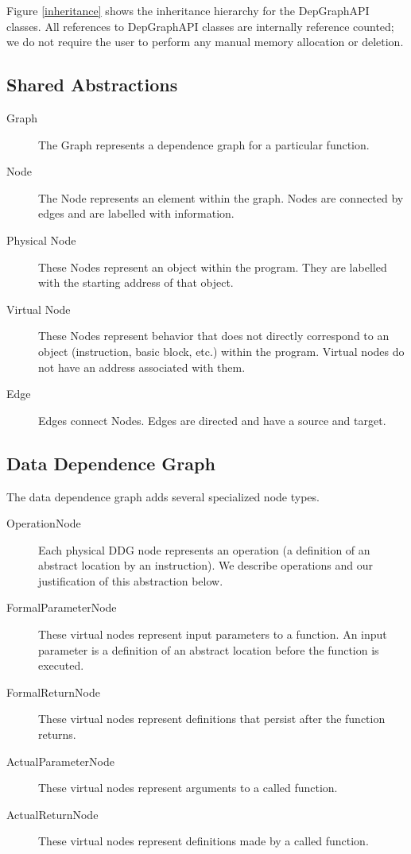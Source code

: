 \documentclass[12pt,titlepage]{article}
\begin{document}
Figure \ref{inheritance} shows the
inheritance hierarchy for the DepGraphAPI classes. All references to
DepGraphAPI classes are internally reference counted; we do not
require the user to perform any manual memory allocation or deletion.

\subsection{Shared Abstractions}

\begin{description}
\item[Graph] The Graph represents a dependence graph for a particular
function.
\item[Node] The Node represents an element within the graph. Nodes are
connected by edges and are labelled with information.
\item[Physical Node] These Nodes represent an object within the
program. They are labelled with the starting address of that object.
\item[Virtual Node] These Nodes represent behavior that does not
directly correspond to an object (instruction, basic block, etc.)
within the program. Virtual nodes do not have an address associated
with them.
\item[Edge] Edges connect Nodes. Edges are directed and have a source
and target.
\end{description}

\subsection{Data Dependence Graph}

The data dependence graph adds several specialized node types.

\begin{description}
\item[OperationNode] Each physical
DDG node represents an operation (a definition of an abstract location
by an instruction). We describe operations and our justification of
this abstraction below.  
\item[FormalParameterNode] These virtual nodes
represent input parameters to a function. An input parameter is a
definition of an abstract location before the function is executed.
\item[FormalReturnNode] These virtual nodes represent definitions that
persist after the function returns.  
\item[ActualParameterNode] These
virtual nodes represent arguments to a called function.
\item[ActualReturnNode] These virtual nodes represent definitions made by a
called function. 
\end{description}
\end{document}

